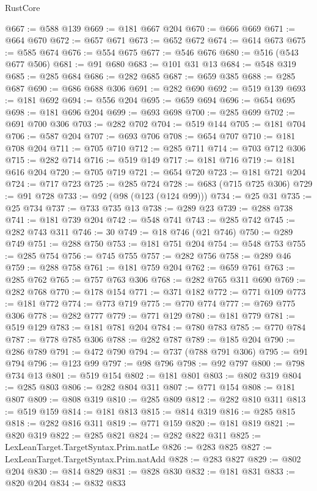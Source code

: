 \begin{lexlean}{RustCore}
\begin{coremodule}
@667 := @588 @139
@669 := @181 @667 @204
@670 := @666 @669
@671 := @664 @670
@672 := @657 @671
@673 := @652 @672
@674 := @614 @673
@675 := @585 @674
@676 := @554 @675
@677 := @546 @676
@680 := @516 (@543 @677 @506)
@681 := @91 @680
@683 := @101 @31 @13
@684 := @548 @319
@685 := @285 @684
@686 := @282 @685
@687 := @659 @385
@688 := @285 @687
@690 := @686 @688 @306
@691 := @282 @690
@692 := @519 @139
@693 := @181 @692
@694 := @556 @204
@695 := @659 @694
@696 := @654 @695
@698 := @181 @696 @204
@699 := @693 @698
@700 := @285 @699
@702 := @691 @700 @306
@703 := @282 @702
@704 := @519 @144
@705 := @181 @704
@706 := @587 @204
@707 := @693 @706
@708 := @654 @707
@710 := @181 @708 @204
@711 := @705 @710
@712 := @285 @711
@714 := @703 @712 @306
@715 := @282 @714
@716 := @519 @149
@717 := @181 @716
@719 := @181 @616 @204
@720 := @705 @719
@721 := @654 @720
@723 := @181 @721 @204
@724 := @717 @723
@725 := @285 @724
@728 := @683 (@715 @725 @306)
@729 := @91 @728
@733 := @92 (@98 (@123 (@124 @99)))
@734 := @25 @31
@735 := @25 @734
@737 := @733 @735 @13
@738 := @289 @23
@739 := @288 @738
@741 := @181 @739 @204
@742 := @548 @741
@743 := @285 @742
@745 := @282 @743 @311
@746 := 30
@749 := @18 @746 (@21 @746)
@750 := @289 @749
@751 := @288 @750
@753 := @181 @751 @204
@754 := @548 @753
@755 := @285 @754
@756 := @745 @755
@757 := @282 @756
@758 := @289 @46
@759 := @288 @758
@761 := @181 @759 @204
@762 := @659 @761
@763 := @285 @762
@765 := @757 @763 @306
@768 := @282 @765 @311 @690
@769 := @282 @768
@770 := @178 @154
@771 := @371 @182
@772 := @771 @109
@773 := @181 @772
@774 := @773 @719
@775 := @770 @774
@777 := @769 @775 @306
@778 := @282 @777
@779 := @771 @129
@780 := @181 @779
@781 := @519 @129
@783 := @181 @781 @204
@784 := @780 @783
@785 := @770 @784
@787 := @778 @785 @306
@788 := @282 @787
@789 := @185 @204
@790 := @286 @789
@791 := @472 @790
@794 := @737 (@788 @791 @306)
@795 := @91 @794
@796 := @123 @99
@797 := @98 @796
@798 := @92 @797
@800 := @798 @734 @13
@801 := @519 @154
@802 := @181 @801
@803 := @802 @319
@804 := @285 @803
@806 := @282 @804 @311
@807 := @771 @154
@808 := @181 @807
@809 := @808 @319
@810 := @285 @809
@812 := @282 @810 @311
@813 := @519 @159
@814 := @181 @813
@815 := @814 @319
@816 := @285 @815
@818 := @282 @816 @311
@819 := @771 @159
@820 := @181 @819
@821 := @820 @319
@822 := @285 @821
@824 := @282 @822 @311
@825 := LexLeanTarget.TargetSyntax.Prim.natLe
@826 := @283 @825
@827 := LexLeanTarget.TargetSyntax.Prim.natAdd
@828 := @283 @827
@829 := @802 @204
@830 := @814 @829
@831 := @828 @830
@832 := @181 @831
@833 := @820 @204
@834 := @832 @833

\end{coremodule}
\end{lexlean}
